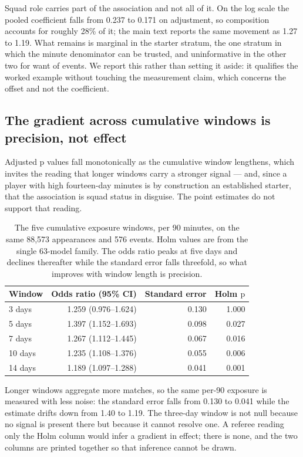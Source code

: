 \documentclass[11pt]{article}
\newcommand{\pval}{\mathrm{p}}
\begin{document}
Squad role carries part of the association and not all of it. On the log scale the pooled coefficient falls from 0.237 to 0.171 on adjustment, so composition accounts for roughly 28\% of it; the main text reports the same movement as 1.27 to 1.19. What remains is marginal in the starter stratum, the one stratum in which the minute denominator can be trusted, and uninformative in the other two for want of events. We report this rather than setting it aside: it qualifies the worked example without touching the measurement claim, which concerns the offset and not the coefficient.

\subsection*{The gradient across cumulative windows is precision, not effect}

Adjusted $\pval$ values fall monotonically as the cumulative window lengthens, which invites the reading that longer windows carry a stronger signal --- and, since a player with high fourteen-day minutes is by construction an established starter, that the association is squad status in disguise. The point estimates do not support that reading.

\begin{table}[h]
\centering
\caption{The five cumulative exposure windows, per 90 minutes, on the same 88,573 appearances and 576 events. Holm values are from the single 63-model family. The odds ratio peaks at five days and declines thereafter while the standard error falls threefold, so what improves with window length is precision.}
\label{tab:supp_window_gradient}
\small
\begin{tabular}{lrrr}
\toprule
Window & Odds ratio (95\% CI) & Standard error & Holm $\pval$\\
\midrule
3 days & 1.259 (0.976--1.624) & 0.130 & 1.000\\
5 days & 1.397 (1.152--1.693) & 0.098 & 0.027\\
7 days & 1.267 (1.112--1.445) & 0.067 & 0.016\\
10 days & 1.235 (1.108--1.376) & 0.055 & 0.006\\
14 days & 1.189 (1.097--1.288) & 0.041 & 0.001\\
\bottomrule
\end{tabular}
\end{table}

Longer windows aggregate more matches, so the same per-90 exposure is measured with less noise: the standard error falls from 0.130 to 0.041 while the estimate drifts down from 1.40 to 1.19. The three-day window is not null because no signal is present there but because it cannot resolve one. A referee reading only the Holm column would infer a gradient in effect; there is none, and the two columns are printed together so that inference cannot be drawn.
\end{document}
